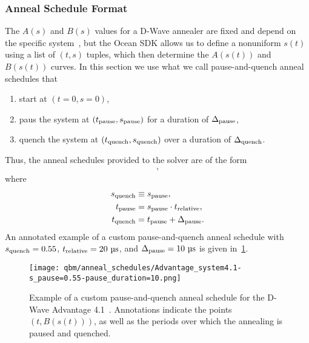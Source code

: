 \subsubsection{Anneal Schedule Format}
The \( A(s) \) and \( B(s) \) values for a D-Wave annealer are fixed and depend on the specific system~\cite{dwave_anneal_schedules}, but the Ocean SDK allows us to define a nonuniform \( s(t) \) using a list of \( (t, s) \) tuples, which then determine the \( A(s(t)) \) and \( B(s(t)) \) curves.
In this section we use what we call pause-and-quench anneal schedules that
\begin{enumerate}
    \item start at \( (t = 0, s = 0) \),
    \item paus the system at \( (t_{\text{pause}}, s_{\text{pause}}) \) for a duration of \( \Delta_{\text{pause}} \),
    \item quench the system at \( (t_{\text{quench}}, s_{\text{quench}}) \) over a duration of \( \Delta_{\text{quench}} \).
\end{enumerate}
Thus, the anneal schedules provided to the solver are of the form
\begin{align}
    [
        (0, 0),
        (\tpause, \spause),
        (\tquench, \squench),
        (\tquench + \Deltaquench, 1)
    ],
\end{align}
where
\begin{align}
\begin{split}
    s_{\text{quench}} &\equiv s_{\text{pause}}, \\
    t_{\text{pause}} &= s_{\text{pause}} \cdot t_{\text{relative}}, \\
    t_{\text{quench}} &= t_{\text{pause}} + \Delta_{\text{pause}}.
\end{split}
\end{align}
An annotated example of a custom pause-and-quench anneal schedule with \( s_{\text{quench}} = 0.55 \), \( t_{\text{relative}} = 20 \ \si{\micro\second} \), and \( \Deltapause = 10 \ \si{\micro\second} \) is given in~\cref{fig:anneal_schedule_annotated}.
\begin{figure}[!htb]
    \begin{center}
        \texttt{[image: qbm/anneal\_schedules/Advantage\_system4.1-s\_pause=0.55-pause\_duration=10.png]}
    \end{center}
    \caption{
        Example of a custom pause-and-quench anneal schedule for the D-Wave Advantage 4.1~\cite{dwave_anneal_schedules}.
        Annotations indicate the points \( (t, B(s(t))) \), as well as the periods over which the annealing is paused and quenched.
    }
    \label{fig:anneal_schedule_annotated}
\end{figure}

